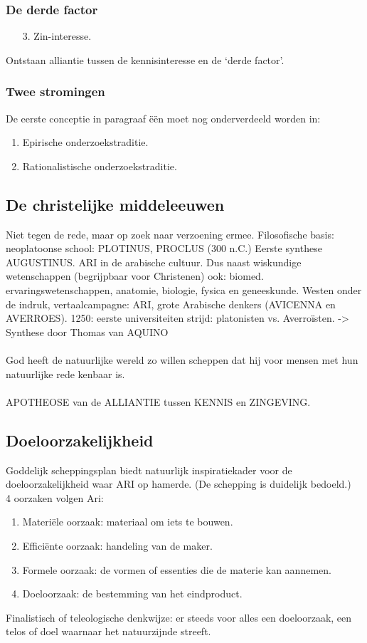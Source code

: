\documentclass[11pt,a4paper]{article}
\begin{document}
\subsubsection{De derde factor}
\begin{enumerate}
\item[3.]Zin-interesse.
\end{enumerate}
Ontstaan alliantie tussen de kennisinteresse en de ‘derde factor’.
\subsubsection{Twee stromingen}
De eerste conceptie in paragraaf \"e\"en moet nog onderverdeeld worden in:
\begin{enumerate}
\item Epirische onderzoekstraditie.
\item Rationalistische onderzoekstraditie.
\end{enumerate}
\subsection{De christelijke middeleeuwen}
Niet tegen de rede, maar op zoek naar verzoening ermee.
Filosofische basis: neoplatoonse school: PLOTINUS, PROCLUS (300 n.C.) Eerste synthese AUGUSTINUS.
ARI in de arabische cultuur. Dus naast wiskundige wetenschappen (begrijpbaar voor Christenen) ook: biomed. ervaringswetenschappen, anatomie, biologie, fysica en geneeskunde.
Westen onder de indruk, vertaalcampagne: ARI, grote Arabische denkers (AVICENNA en AVERROES).
1250: eerste universiteiten strijd: platonisten vs. Averroïsten.
-> Synthese door Thomas van AQUINO
\\
\\
God heeft de natuurlijke wereld zo willen scheppen dat hij voor mensen met hun natuurlijke rede kenbaar is.
\\
\\
APOTHEOSE van de ALLIANTIE tussen KENNIS en ZINGEVING.
\subsection{Doeloorzakelijkheid}
Goddelijk scheppingsplan biedt natuurlijk inspiratiekader voor de doeloorzakelijkheid waar ARI op hamerde. (De schepping is duidelijk bedoeld.)
\\
4 oorzaken volgen Ari:
\begin{enumerate}
\item Materi\"ele oorzaak: materiaal om iets te bouwen.
\item Effici\"ente oorzaak: handeling van de maker.
\item Formele oorzaak: de vormen of essenties die de materie kan aannemen.
\item Doeloorzaak: de bestemming van het eindproduct.
\end{enumerate}
Finalistisch of teleologische denkwijze: er steeds voor alles een doeloorzaak, een telos of doel waarnaar het natuurzijnde streeft.
\end{document}
